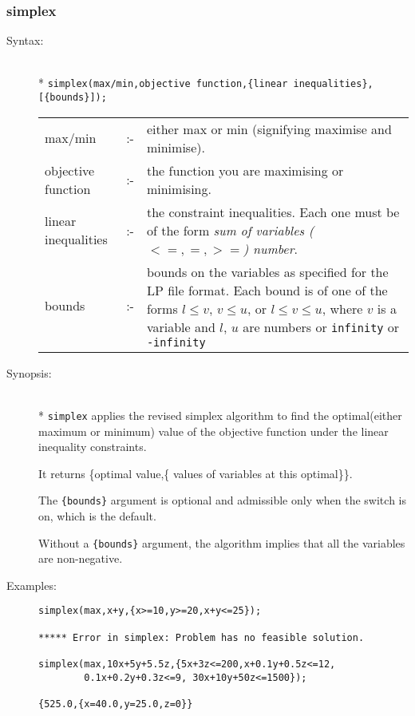 \subsubsection{simplex}
\label{linalg:simplex}
\hypertarget{operator:SIMPLEX}{}

\begin{description}
\item[Syntax:]\mbox{}\\*
\texttt{simplex(max/min,objective function,\{linear
inequalities\},[\{bounds\}]);}\\[2mm]
\begin{tabular}{l l p{.63\linewidth}}
  max/min             & :- & either max or min
    (signifying maximise and minimise). \\
  objective function  & :- & the function you are maximising or
  minimising. \\
  linear inequalities & :- & the constraint
    inequalities. Each one must be of the form
    \textit{sum of variables ($<=,=,>=$) number}.\\
  bounds & :- & bounds on the variables as
    specified for the LP file format. Each bound is of one of the forms $l\leq
    v$, $v\leq u$, or $l\leq v\leq u$, where $v$ is a variable and $l$, $u$ are
    numbers or \texttt{infinity} or \texttt{-infinity}
\end{tabular}

\item[Synopsis:]\mbox{}\\*
\texttt{simplex} applies the revised simplex algorithm to find the
optimal(either maximum or minimum) value of the objective function
under the linear inequality constraints.

It returns \{optimal value,\{ values of variables at this optimal\}\}.

\hypertarget{switch:FASTSIMPLEX}{}
The \texttt{\{bounds\}} argument is optional and admissible only when the switch
 is on, which is the default.

Without a \texttt{\{bounds\}} argument, the algorithm implies that all the
variables are non-negative.

\item[Examples:]
\begin{verbatim}
simplex(max,x+y,{x>=10,y>=20,x+y<=25});

***** Error in simplex: Problem has no feasible solution.

simplex(max,10x+5y+5.5z,{5x+3z<=200,x+0.1y+0.5z<=12,
        0.1x+0.2y+0.3z<=9, 30x+10y+50z<=1500});

{525.0,{x=40.0,y=25.0,z=0}}
\end{verbatim}
\end{description}



